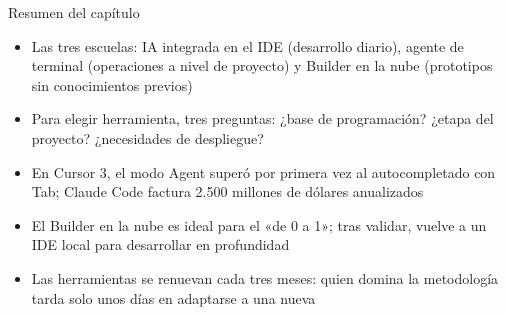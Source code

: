 \begin{tcbsummary}{Resumen del capítulo}
\begin{itemize}
  \item Las tres escuelas: IA integrada en el IDE (desarrollo diario), agente de terminal (operaciones a nivel de proyecto) y Builder en la nube (prototipos sin conocimientos previos)
  \item Para elegir herramienta, tres preguntas: ¿base de programación? ¿etapa del proyecto? ¿necesidades de despliegue?
  \item En Cursor 3, el modo Agent superó por primera vez al autocompletado con Tab; Claude Code factura 2.500 millones de dólares anualizados
  \item El Builder en la nube es ideal para el «de 0 a 1»; tras validar, vuelve a un IDE local para desarrollar en profundidad
  \item Las herramientas se renuevan cada tres meses: quien domina la metodología tarda solo unos días en adaptarse a una nueva
\end{itemize}

\end{tcbsummary}
